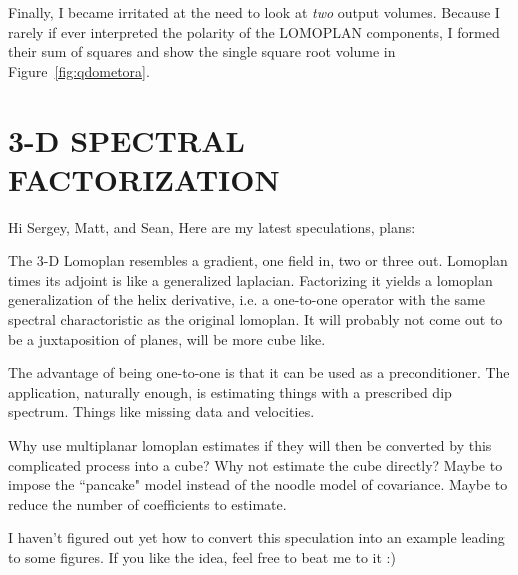 \par
Finally, I became irritated at the need to look at {\it two} output volumes.
Because I rarely if ever interpreted the polarity of the LOMOPLAN components,
I formed their sum of squares and show the single
square root volume in Figure~\ref{fig:qdometora}.


\section{3-D SPECTRAL FACTORIZATION}
Hi Sergey, Matt, and Sean,
Here are my latest speculations, plans:

The 3-D Lomoplan resembles a gradient, one field in, two or three out.
Lomoplan times its adjoint is like a generalized laplacian.
Factorizing it yields a lomoplan generalization of the helix derivative,
i.e. a one-to-one operator with the same spectral charactoristic
as the original lomoplan.
It will probably not come out to be a juxtaposition of planes,
will be more cube like.

The advantage of being one-to-one is
that it can be used as a preconditioner.
The application, naturally enough,
is estimating things with a prescribed dip spectrum.
Things like missing data and velocities.

Why use multiplanar lomoplan estimates if they will then be
converted by this complicated process into a cube?
Why not estimate the cube directly?  Maybe to impose
the ``pancake" model instead of the noodle model of covariance.
Maybe to reduce the number of coefficients to estimate.

I haven't figured out yet how to convert this speculation
into an example leading to some figures.
If you like the idea, feel free to beat me to it :)



